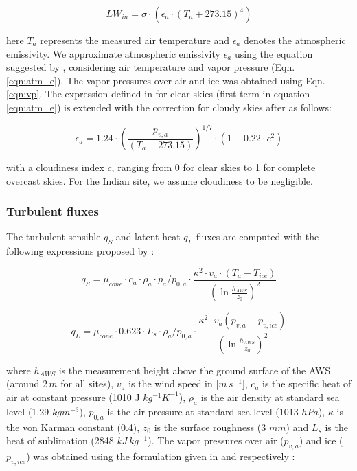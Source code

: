 \documentclass[utf8]{frontiersSCNS} %
\begin{document}
\begin{equation}
	LW_{in}=\sigma \cdot (\epsilon_a \cdot {(T_a+ 273.15)}^4)
	\label{eqn:LWin}
\end{equation}

here $T_a$ represents the measured air temperature and $\epsilon_a$ denotes the atmospheric emissivity. We
approximate atmospheric emissivity $\epsilon_a$ using the equation suggested by \cite{Brutsaert_1982},
considering air temperature and vapor pressure (Eqn.  \ref{eqn:atm_e}). The vapor pressures over air and ice was
obtained using Eqn. \ref{eqn:vp}.  The expression defined in \cite{Brutsaert_1975} for clear skies (first term
in equation \ref{eqn:atm_e}) is extended with the correction for cloudy skies after \cite{Brutsaert_1982} as
follows:

\begin{equation}
	\epsilon_a=1.24 \cdot (\frac{p_{v,a}}{(T_a+273.15)})^{1/7}\cdot(1+0.22\cdot{c}^2) \label{eqn:atm_e}
\end{equation}

with a cloudiness index $c$, ranging from 0 for clear skies to 1 for complete overcast skies. For the Indian
site, we assume cloudiness to be negligible.

\subsubsection{Turbulent fluxes}

The turbulent sensible $q_{S}$ and latent heat $q_{L}$ fluxes are computed with the following expressions
proposed by \cite{Garratt_1992}:

\begin{equation}
	q_{S}=\mu_{cone}\cdot c_{a} \cdot \rho_{a} \cdot p_{a}/p_{0,a} \cdot \frac{\kappa^2 \cdot v_a \cdot
		(T_a-T_{ice})}{{(\ln{\frac{h_{AWS}}{z_{0}}})}^2}
	\label{eqn:qs}
\end{equation}

\begin{equation}
	q_{L}=\mu_{cone}\cdot 0.623 \cdot L_s \cdot \rho_{a}/p_{0,a} \cdot \frac{\kappa^2 \cdot
	v_a(p_{v,a}-p_{v,ice})}{{(\ln{\frac{h_{AWS}}{z_{0}}})}^2}
\end{equation}

where $h_{AWS}$ is the measurement height above the ground surface of the AWS (around $2\,m$ for all sites),
$v_a$ is the wind speed in [$m\,s^{-1}$], $c_a$ is the specific heat of air at constant pressure (1010 J
$kg^{-1} K^{-1}$), $\rho_{a}$ is the air density at standard sea level (1.29 $kg m^{-3}$), $p_{0,a}$ is the air
pressure at standard sea level (1013 $hPa$), $\kappa$ is the von Karman constant (0.4), $z_{0}$ is the surface
roughness (3 $mm$) and $L_s$ is the heat of sublimation (2848 $kJ\,kg^{-1}$).  The vapor pressures over air
($p_{v,a}$) and ice ($p_{v,ice}$) was obtained using the formulation given in \cite{WMO_2018} and
\cite{huang_2018} respectively  :
\end{document}
